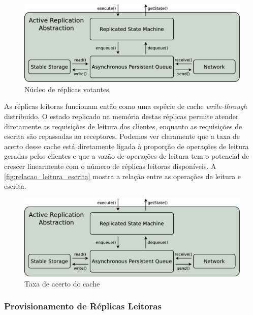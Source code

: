 \begin{figure}[ht]
  \begin{center}
    \includegraphics[width=14cm]{conteudo/capitulos/figuras/treplica.eps}
  \end{center}
  \caption{Núcleo de réplicas votantes}
  \label{fig:nucleo_replicas_votantes}
\end{figure}

As réplicas leitoras funcionam então como uma espécie de cache \emph{write-through}
distribuído. O estado replicado na memória destas réplicas permite atender diretamente as
requisições de leitura dos clientes, enquanto as requisições de escrita são repassadas ao
receptores. Podemos ver claramente que a taxa de acerto desse cache está diretamente
ligada à proporção de operações de leitura geradas pelos clientes e que a vazão de
operações de leitura tem o potencial de crescer linearmente com o número de réplicas
leitoras disponíveis. A \autoref{fig:relacao_leitura_escrita} mostra a relação entre as
operações de leitura e escrita.

\begin{figure}[ht]
  \begin{center}
    \includegraphics[width=14cm]{conteudo/capitulos/figuras/treplica.eps}
  \end{center}
  \caption{Taxa de acerto do cache}
  \label{fig:relacao_leitura_escrita}
\end{figure}

\subsubsection{Provisionamento de Réplicas Leitoras}

